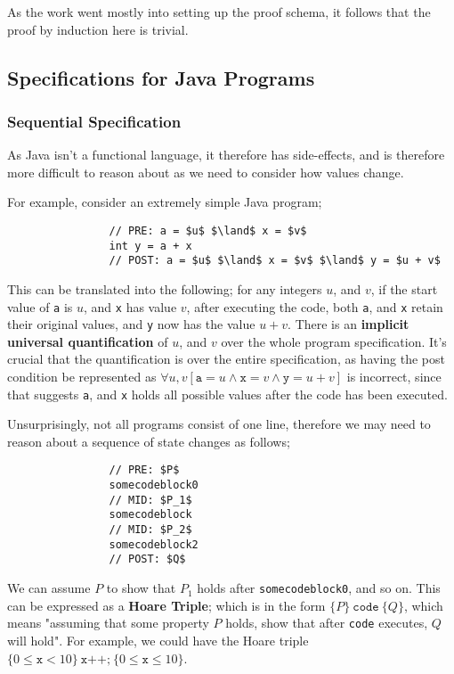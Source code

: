 \documentclass[a4paper, 12pt]{article}
\begin{document}
            As the work went mostly into setting up the proof schema, it follows that the proof by induction here is trivial.
    \subsection*{Specifications for Java Programs}
        \subsubsection*{Sequential Specification}
            As Java isn't a functional language, it therefore has side-effects, and is therefore more difficult to reason about as we need to consider how values change.
            \medskip

            For example, consider an extremely simple Java program;
            \begin{lstlisting}
                // PRE: a = $u$ $\land$ x = $v$
                int y = a + x
                // POST: a = $u$ $\land$ x = $v$ $\land$ y = $u + v$
            \end{lstlisting}
            This can be translated into the following; for any integers $u$, and $v$, if the start value of \texttt{a} is $u$, and \texttt{x} has value $v$, after executing the code, both \texttt{a}, and \texttt{x} retain their original values, and \texttt{y} now has the value $u + v$. There is an \textbf{implicit universal quantification} of $u$, and $v$ over the whole program specification. It's crucial that the quantification is over the entire specification, as having the post condition be represented as $\forall u, v [\texttt{a} = u \land \texttt{x} = v \land \texttt{y} = u + v]$ is incorrect, since that suggests \texttt{a}, and \texttt{x} holds all possible values after the code has been executed.
            \medskip

            Unsurprisingly, not all programs consist of one line, therefore we may need to reason about a sequence of state changes as follows;
            \begin{lstlisting}
                // PRE: $P$
                somecodeblock0
                // MID: $P_1$
                somecodeblock
                // MID: $P_2$
                somecodeblock2
                // POST: $Q$
            \end{lstlisting}
            We can assume $P$ to show that $P_1$ holds after \texttt{somecodeblock0}, and so on. This can be expressed as a \textbf{Hoare Triple}; which is in the form $\{ P \}\ \texttt{code}\ \{ Q \}$, which means "assuming that some property $P$ holds, show that after \texttt{code} executes, $Q$ will hold". For example, we could have the Hoare triple $\{ 0 \leq \texttt{x} < 10 \}\ \texttt{x++;}\ \{0 \leq \texttt{x} \leq 10\}$.
            \smallskip
\end{document}
